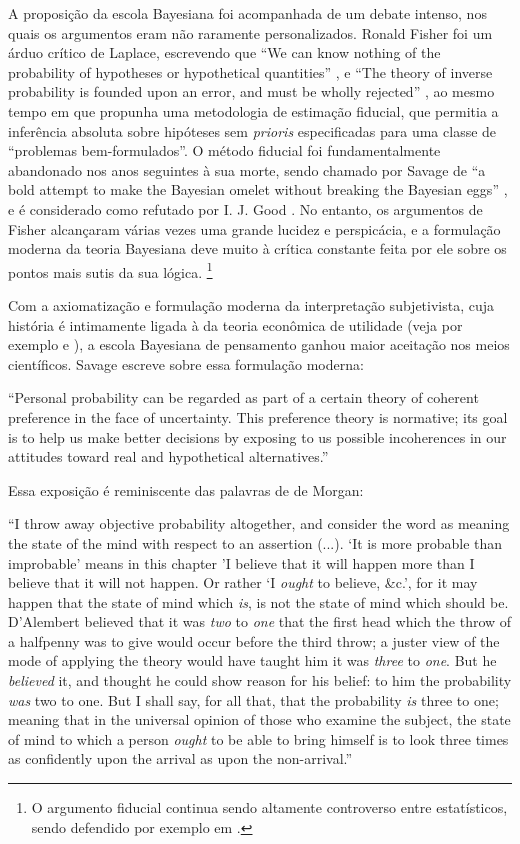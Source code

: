 A proposição da escola Bayesiana foi acompanhada de um debate intenso, nos quais os argumentos eram não raramente personalizados.
Ronald Fisher foi um árduo crítico
de Laplace, escrevendo que ``We can know nothing of the probability of hypotheses or hypothetical quantities'' \citep{Fisher1921},
e ``The theory of inverse probability is founded upon an error, and must be wholly rejected'' \citep{Fisher1925}, ao mesmo tempo
em que propunha uma metodologia de estimação fiducial, que permitia a inferência absoluta sobre hipóteses sem {\em prioris} 
especificadas para uma classe de ``problemas bem-formulados''. O método fiducial foi fundamentalmente abandonado nos anos 
seguintes à sua morte, sendo chamado por Savage de ``a bold attempt to make the Bayesian omelet without
breaking the Bayesian eggs'' \citep{Savage60}, e é considerado como refutado por 
I. J. Good \citep{Good92}. No entanto, os argumentos de Fisher
alcançaram várias vezes uma grande lucidez e perspicácia, e a formulação moderna da teoria Bayesiana 
deve muito à crítica constante feita por ele sobre os pontos mais sutis da sua lógica. \footnote{
O argumento fiducial continua sendo altamente controverso entre estatísticos, sendo defendido por exemplo
em \citep{Hacking65}.}

Com a axiomatização e formulação moderna da interpretação subjetivista, cuja história é intimamente ligada à da teoria
econômica de utilidade (veja por exemplo \citep{Friedman48} e \citep{Pfanzagl67}),
a escola Bayesiana de pensamento ganhou maior aceitação nos meios científicos. Savage escreve sobre essa formulação moderna:

``Personal probability can be regarded as part of a certain theory of coherent preference in the face of uncertainty. This
preference theory is normative; its goal is to help us make better decisions by exposing to us possible incoherences in our
attitudes toward real and hypothetical alternatives.'' \citep{Savage67}

Essa exposição é reminiscente das palavras de de Morgan:

``I throw away objective probability altogether, and consider the word as meaning the state of the mind with respect to an 
assertion (...). `It is more probable than improbable' means in this chapter 'I believe that it will happen more than I 
believe that it will not happen. Or rather `I {\em ought} to believe, \&c.', for it may happen that the state of mind which {\em
is}, is not the state of mind which should be. 
D'Alembert believed that it was {\em two} to {\em one} that the first head which the throw of a halfpenny was to give would occur
before the third throw; a juster view of the mode of applying the theory would have taught him it was {\em three} to {\em one}.
But he {\em believed} it, and thought he could show reason for his belief: to him the probability {\em was} two to one. But 
I shall say, for all that, that the probability {\em is} three to one; meaning that in the universal opinion of those who
examine the subject, the state of mind to which a person {\em ought} to be able to bring himself is to look three times
as confidently upon the arrival as upon the non-arrival.''\citep{deMorgan1847}

